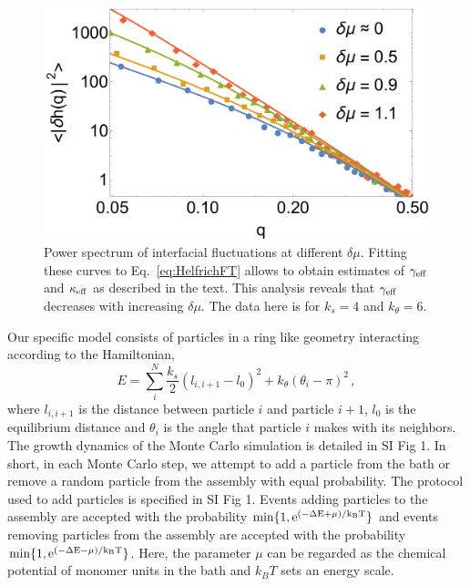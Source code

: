 \documentclass[amsmath,preprintnumbers,10pt,nofootinbib,prl,twocolumn]{revtex4-1}
\begin{document}
\begin{figure}[tbb]
\centering
\includegraphics[scale=0.34]{newscalingacrossFig3.pdf}
\caption{Power spectrum of interfacial fluctuations at different $\delta\mu$. Fitting these curves to Eq.~\ref{eq:HelfrichFT} allows to obtain estimates of $\gamma_{\rm eff}$ and $\kappa_{\rm eff}$ as described in the text. This analysis reveals that $\gamma_{\rm eff}$ decreases with increasing $\delta\mu$. The data here is for $k_s=4$ and $k_\theta = 6$.} \label{fig:Helfrich}
\end{figure}




Our specific model consists of particles in a ring like geometry interacting according to the Hamiltonian, 
\begin{equation}
\label{eq:Halmitonianl}
E=\sum_i^N{\frac{k_s}{2}(l_{i,i+1}-l_0)^2+k_\theta(\theta_i-\pi)^2}\,,
\end{equation}
where $l_{i,i+1}$ is the distance between particle $i$ and particle $i+1$, $l_0$ is the equilibrium distance and $\theta_i$ is the angle that particle $i$ makes with its neighbors. The growth dynamics of the Monte Carlo simulation is detailed in SI Fig 1. In short, in each Monte Carlo step, we attempt to add a particle from the bath or remove a random particle from the assembly with equal probability. The protocol used to add particles is specified in SI Fig 1.  Events adding particles to the assembly are accepted with the probability $\rm{min}\{1,e^{(-\Delta E +\mu)/k_B T}\}$ and events removing particles from the assembly are accepted with the probability $\rm{min}\{1,e^{(-\Delta E -\mu)/k_B T}\}$. Here, the parameter $\mu$ can be regarded as the chemical potential of monomer units in the bath and $k_B T$ sets an energy scale. 
\end{document}
